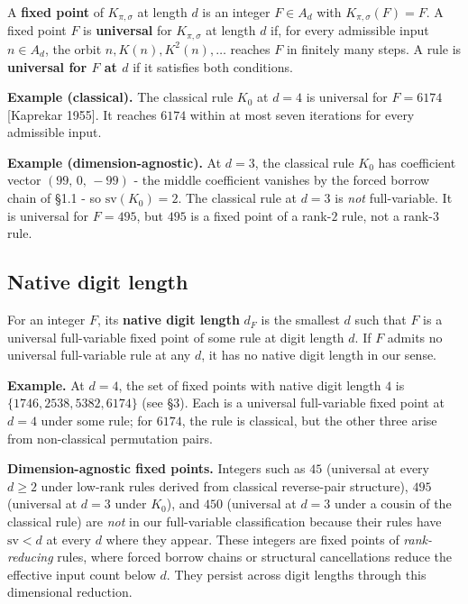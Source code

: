 \documentclass[11pt,letterpaper]{article}
\theoremstyle{paperstyle}
\theoremstyle{paperstyledef}
\theoremstyle{paperstylerem}
\begin{document}
A \textbf{fixed point} of \(K_{\pi, \sigma}\) at length \(d\) is an
integer \(F \in A_d\) with \(K_{\pi, \sigma}(F) = F\). A fixed point
\(F\) is \textbf{universal} for \(K_{\pi, \sigma}\) at length \(d\) if,
for every admissible input \(n \in A_d\), the orbit
\(n, K(n), K^2(n), \ldots\) reaches \(F\) in finitely many steps. A rule
is \textbf{universal for \(F\) at \(d\)} if it satisfies both
conditions.

\textbf{Example (classical).} The classical rule \(K_0\) at \(d = 4\) is
universal for \(F = 6174\) {[}Kaprekar 1955{]}. It reaches \(6174\)
within at most seven iterations for every admissible input.

\textbf{Example (dimension-agnostic).} At \(d = 3\), the classical rule
\(K_0\) has coefficient vector \((99, \, 0, \, -99)\) - the middle
coefficient vanishes by the forced borrow chain of §1.1 - so
\(\mathrm{sv}(K_0) = 2\). The classical rule at \(d = 3\) is \emph{not}
full-variable. It is universal for \(F = 495\), but \(495\) is a fixed
point of a rank-\(2\) rule, not a rank-\(3\) rule.

\hypertarget{native-digit-length}{%
\subsection{Native digit length}\label{native-digit-length}}

For an integer \(F\), its \textbf{native digit length} \(d_F\) is the
smallest \(d\) such that \(F\) is a universal full-variable fixed point
of some rule at digit length \(d\). If \(F\) admits no universal
full-variable rule at any \(d\), it has no native digit length in our
sense.

\textbf{Example.} At \(d = 4\), the set of fixed points with native
digit length \(4\) is \(\{1746, 2538, 5382, 6174\}\) (see §3). Each is a
universal full-variable fixed point at \(d = 4\) under some rule; for
\(6174\), the rule is classical, but the other three arise from
non-classical permutation pairs.

\textbf{Dimension-agnostic fixed points.} Integers such as \(45\)
(universal at every \(d \geq 2\) under low-rank rules derived from
classical reverse-pair structure), \(495\) (universal at \(d = 3\) under
\(K_0\)), and \(450\) (universal at \(d = 3\) under a cousin of the
classical rule) are \emph{not} in our full-variable classification
because their rules have \(\mathrm{sv} < d\) at every \(d\) where they
appear. These integers are fixed points of \emph{rank-reducing} rules,
where forced borrow chains or structural cancellations reduce the
effective input count below \(d\). They persist across digit lengths
through this dimensional reduction.
\end{document}
